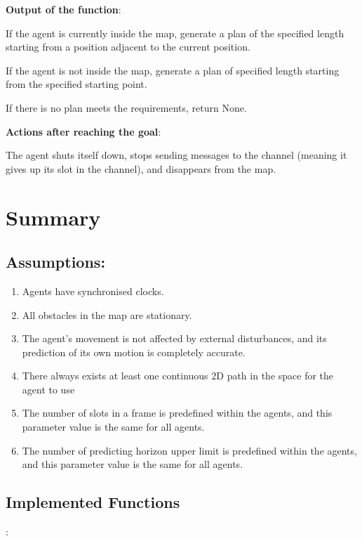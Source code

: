 \textbf{Output of the function}:

If the agent is currently inside the map, generate a plan of the specified length starting from a position adjacent to the current position.

If the agent is not inside the map, generate a plan of specified length starting from the specified starting point.

If there is no plan meets the requirements, return None.

\textbf{Actions after reaching the goal}:

The agent shuts itself down, stops sending messages to the channel (meaning it gives up its slot in the channel), and disappears from the map.

\section{Summary}

\subsection{Assumptions:}
\begin{enumerate}
    \item Agents have synchronised clocks.
    \item All obstacles in the map are stationary.
    \item The agent’s movement is not affected by external disturbances, and
    its prediction of its own motion is completely accurate.
    \item There always exists at least one continuous 2D path in the space
    for the agent to use
    \item  The number of slots in a frame is predefined within the agents, and
    this parameter value is the same for all agents.
    \item The number of predicting horizon upper limit is predefined within the
    agents, and this parameter value is the same for all agents.
\end{enumerate}

\subsection{Implemented Functions}:

